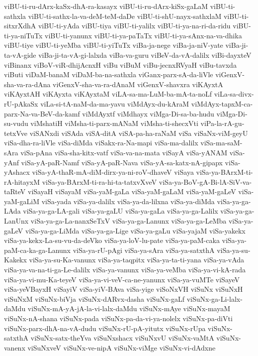 {viBU-ti-ru-dArx-kaSx-dhA-ra-kasayx
viBU-ti-ru-dArx-kiSx-gaLaM
viBU-ti-sathxla
viBU-ti-sathx-la-va-deM-teM-daDe
viBU-ti-shU-nayx-sathxlaM
viBU-ti-sitxrXdhA
viBU-ti-yAda
viBU-tiya
viBU-ti-yalilx
viBU-ti-ya-na-ri-da-ridu
viBU-ti-ya-niTuTx
viBU-ti-yanunx
viBU-ti-ya-paTaTx
viBU-ti-ya-sAnx-na-va-dhika
viBU-tiye
viBU-ti-yeMba
viBU-ti-yiTuTx
viBa-ja-nege
viBa-ja-niV-yate
viBa-ji-ta-vA-gide
viBa-ji-ta-vA-gi-lalxda
viBa-va-guru
viBeV-da-vA-dalilx
viBi-dayxteV
viBinanx
viBoV-viR-dhijAcnxH
viBu
viBuM
viBu-jecnxRVyaH
viBu-tavxda
viButi
viDaM-banaM
viDaM-ba-na-sathxla
viGanx-parx-sA-da-liVle
viGenxV-sha-va-ra-dAna
viGenxV-sha-va-ra-dAnaM
viGenxV-shavxra
viKAyxtA
viKAyxtAH
viKAyxta
viKAyxtaM
viLA-sa-ma-LuM-ba-mA-ta-noLf
viLa-sa-divx-rU-pAkaSx
viLa-si-tA-naM-da-ma-yavu
viMdAyx-du-kAraM
viMdAyx-tapxM-ca-parx-Na-va-BeV-da-kamf
viMdAyxtf
viMdhayx
viMga-Di-sa-ba-hudu
viMga-Di-su-vudu
viMshatiH
viMsha-ti-parx-mANaM
viMsha-ti-shecxVti
viPa-la-rA-gu-tetxVve
viSANxdi
viSAda
viSA-ditA
viSA-pa-ha-raNaM
viSa
viSaNx-viM-geyU
viSa-dha-ra-liVle
viSa-diMda
viSakx-ra-Na-mapi
viSa-ma-dalilx
viSa-ma-saM-sAra
viSa-pAna
viSa-sha-kitx-vatf
viSa-va-na-mata
viSayA
viSa-yANAM
viSa-yAnf
viSa-yA-paR-Namf
viSa-yA-paR-Nava
viSa-yA-sa-katx-nA-gipapx
viSa-yAshacx
viSa-yA-thaR-mA-diM-dirx-ya-ni-roV-dhaveV
viSaya
viSa-ya-BArxM-ti-rA-hitayxM
viSa-ya-BArxM-ti-ra-hi-ta-tatxvXveV
viSa-ya-BoV-gA-Bi-lA-SiV-va-taRteV
viSayaH
viSayaM
viSa-yaM-gaLa
viSa-yaM-gaLaM
viSa-yaM-gaLeV
viSa-yaM-gaLiM
viSa-yada
viSa-ya-dalilx
viSa-ya-da-lilxna
viSa-ya-diMda
viSa-ya-ga-LAda
viSa-ya-ga-LA-gali
viSa-ya-gaLU
viSa-ya-gaLa
viSa-ya-ga-Lalilx
viSa-ya-ga-LanUnx
viSa-ya-ga-La-nanxSeTxV
viSa-ya-ga-Lanunx
viSa-ya-ga-LeMba
viSa-ya-gaLeV
viSa-ya-ga-LiMda
viSa-ya-ga-Lige
viSa-ya-gaLu
viSa-yajaM
viSa-yakekx
viSa-ya-kekx-La-su-vu-da-deVko
viSa-ya-loV-lu-pate
viSa-ya-paM-caka
viSa-ya-paM-ca-ka-ga-Lanunx
viSa-ya-rU-pAgi
viSa-ya-sAra
viSa-ya-satxthA
viSa-ya-su-Kakekx
viSa-ya-su-Ka-vanunx
viSa-ya-taqpitx
viSa-ya-ta-ti-yana
viSa-ya-vAda
viSa-ya-va-na-ti-ga-Le-dalilx
viSa-ya-vanunx
viSa-ya-veMba
viSa-ya-vi-kA-rada
viSa-ya-vi-mu-Ka-teyeV
viSa-ya-vi-veV-ca-ne-yanunx
viSa-ya-vuMTe
viSayeV
viSa-yeVBayxH
viSayiV
viSa-yiV-BAva
viSa-yige
viSoNxVH
viSuNx
viSuNxH
viSuNxM
viSuNx-biVja
viSuNx-dARvx-dasha
viSuNx-gaLf
viSuNx-ga-Li-lalx-daMdu
viSuNx-mA-yA-jA-la-vi-lalx-daMdu
viSuNx-mAye
viSuNx-mayaM
viSuNx-nA-shana
viSuNx-pada
viSuNx-pa-da-vi-ya-nolelx
viSuNx-pa-diVti
viSuNx-parx-dhA-na-vA-dudu
viSuNx-rU-pA-yitutx
viSuNx-rUpa
viSuNx-satxthA
viSuNx-satx-theYva
viSuNxshacx
viSuNxvU
viSuNx-vaMtA
viSuNx-vanenx
viSuNxveV
viSuNx-ve-nipA
viSuNx-viMge
viSuNx-vi-dAdxne
}
